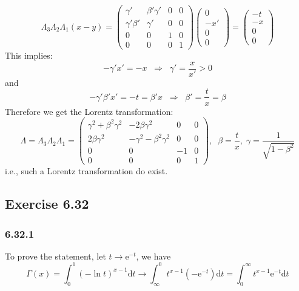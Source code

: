 \documentclass[]{ctexart}
\begin{document}
			\begin{equation*}
			\Lambda_3\Lambda_2\Lambda_1(x-y)=\begin{pmatrix}
			\gamma' & \beta'\gamma' & 0 & 0\\
			\gamma'\beta' & \gamma' & 0 & 0\\
			0 & 0 & 1 & 0\\
			0 & 0 & 0 & 1 
			\end{pmatrix}\begin{pmatrix}
			0 \\ -x'\\0\\0
			\end{pmatrix}=\begin{pmatrix}
			-t\\-x\\0\\0
			\end{pmatrix}
			\end{equation*}
			This implies: 
			\begin{equation*}
			-\gamma'x'=-x\;\;\Rightarrow\;\;\gamma'=\frac{x}{x'}>0
			\end{equation*}
			and 
			\begin{equation*}
			-\gamma'\beta'x'=-t=\beta'x\;\;\Rightarrow\;\;\beta'=\frac tx=\beta
			\end{equation*}
			Therefore we get the Lorentz transformation: 
			\begin{equation*}
			\Lambda=\Lambda_3\Lambda_2\Lambda_1=\begin{pmatrix}
			\gamma^2+\beta^2\gamma^2 & -2\beta\gamma^2 & 0 & 0\\
			2\beta\gamma^2 & -\gamma^2-\beta^2\gamma^2 & 0 & 0\\
			0 & 0 & -1 & 0\\
			0 & 0 & 0 & 1
			\end{pmatrix},\;\;\beta=\frac tx,\;\gamma=\frac{1}{\sqrt{1-\beta^2}}
			\end{equation*}
			i.e., such a Lorentz transformation do exist. 
	
	\subsection{Exercise 6.32}
	\subsubsection*{6.32.1}
	To prove the statement, let $t\to\mathrm{e}^{-t}$, we have 
	\begin{equation*}
	\Gamma(x)=\int_0^1(-\ln t)^{x-1}\mathrm{d}t\to\int_{\infty}^0t^{x-1}(-\mathrm{e}^{-t})\mathrm{d}t=\int_0^\infty t^{x-1}\mathrm{e}^{-t}\mathrm{d}t
	\end{equation*}
\end{document}
